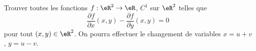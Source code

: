 \begin{exercice}[\coolexo]\label{exoCalculDifferentiel0009}

 Trouver toutes les fonctions $f:\eR^2\to\eR$, ${ C}^1$ sur $\eR^2$ telles que 
\begin{equation}
	\frac{\partial f}{\partial x}(x,y) - \frac{\partial f}{\partial y}(x,y) = 0
\end{equation}
pour tout $(x,y)\in\eR^2$. On pourra effectuer le changement de variables $x= u+v$, $y= u -v$.

\end{exercice}
